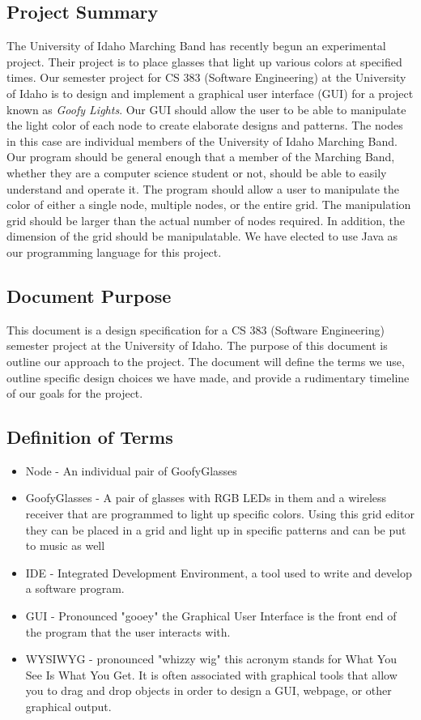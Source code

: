 \documentclass[12pt]{article}
\begin{document}
		\subsection{Project Summary}
		The University of Idaho Marching Band has recently begun an experimental project. Their project is to place glasses that light up various colors at specified times. Our semester project for CS 383 (Software Engineering) at the University of Idaho is to design and implement a graphical user interface (GUI) for a project known as \textit{Goofy Lights}. Our GUI should allow the user to be able to manipulate the light color of each node to create elaborate designs and patterns. The nodes in this case are individual members of the University of Idaho Marching Band. Our program should be general enough that a member of the Marching Band, whether they are a computer science student or not, should be able to easily understand and operate it. The program should allow a user to manipulate the color of either a single node, multiple nodes, or the entire grid. The manipulation grid should be larger than the actual number of nodes required. In addition, the dimension of the grid should be manipulatable. We have elected to use Java as our programming language for this project.
		
		\subsection{Document Purpose}
		This document is a design specification for a CS 383 (Software Engineering) semester project at the University of Idaho. The purpose of this document is outline our approach to the project. The document will define the terms we use, outline specific design choices we have made, and provide a rudimentary timeline of our goals for the project. 
		
		\subsection{Definition of Terms}
		\begin{itemize}
			\item Node - An individual pair of GoofyGlasses
			\item GoofyGlasses - A pair of glasses with RGB LEDs in them and a wireless receiver that are programmed to light up specific colors. Using this grid editor they can be placed in a grid and light up in specific patterns and can be put to music as well
			\item IDE - Integrated Development Environment, a tool used to write and develop a software program.
			\item GUI - Pronounced "gooey" the Graphical User Interface is the front end of the program that the user interacts with.
			\item WYSIWYG - pronounced "whizzy wig" this acronym stands for What You See Is What You Get. It is often associated with graphical tools that allow you to drag and drop objects in order to design a GUI, webpage, or other graphical output. 
			
		\end{itemize}
		
\end{document}
